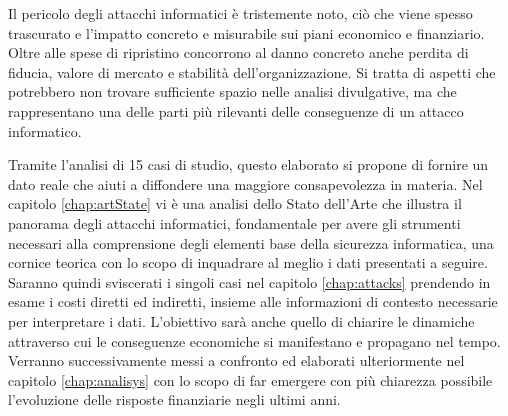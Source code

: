 \documentclass[12pt,a4paper,twoside]{report}
\begin{document}
Il pericolo degli attacchi informatici \`e tristemente noto, ci\`o che viene
spesso trascurato e l'impatto concreto e misurabile sui piani economico e finanziario. 
Oltre alle spese di ripristino concorrono al danno concreto anche perdita di fiducia, valore di mercato e stabilit\`a dell'organizzazione. 
Si tratta di aspetti che potrebbero non trovare sufficiente spazio nelle analisi divulgative, ma che
rappresentano una delle parti pi\`u rilevanti delle conseguenze di un attacco informatico.


Tramite l'analisi di 15 casi di studio, questo elaborato si propone di fornire un dato reale che aiuti a diffondere una 
maggiore consapevolezza in materia. Nel capitolo \ref{chap:artState} vi \`e una analisi dello Stato dell'Arte che
illustra il panorama degli attacchi informatici, fondamentale per avere gli strumenti necessari alla comprensione degli elementi base
della sicurezza informatica, una cornice teorica con lo scopo di inquadrare al meglio i dati presentati a seguire.\\
Saranno quindi sviscerati i singoli casi nel capitolo \ref{chap:attacks} prendendo in esame
i costi diretti ed indiretti, insieme alle informazioni di contesto necessarie per interpretare i dati. 
L'obiettivo sar\`a anche quello  di chiarire le dinamiche attraverso cui le conseguenze economiche si manifestano e 
propagano nel tempo. Verranno successivamente messi  a confronto ed elaborati ulteriormente nel capitolo \ref{chap:analisys} con lo scopo di 
far emergere con pi\`u chiarezza possibile l'evoluzione delle risposte finanziarie negli ultimi anni. 
\newpage


\end{document}
